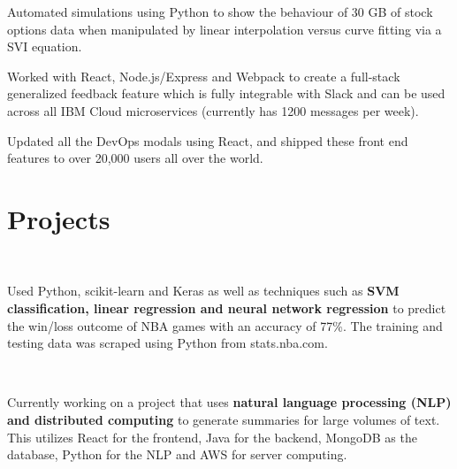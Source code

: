 \documentclass[]{anand-resume}
\begin{document}
\begin{minipage}[t]{0.69\textwidth}
\begin{tightemize}
\item Automated simulations using Python to show the behaviour of 30 GB of stock options data when manipulated by linear interpolation versus curve fitting via a SVI equation.
\end{tightemize}
\sectionsep

\begin{tightemize}\item Worked with React, Node.js/Express and Webpack to create a full-stack generalized feedback feature which is fully integrable with Slack and can be used across all IBM Cloud microservices (currently has 1200 messages per week).

\item Updated all the DevOps modals using React, and shipped these front end features to over 20,000 users all over the world.
\end{tightemize}
\sectionsep



\section{Projects}
\\
\begin{tightemize}\item Used Python, scikit-learn and Keras as well as techniques such as \textbf{SVM classification, linear regression and neural network regression} to predict the win/loss outcome of NBA games with an accuracy of 77\%. The training and testing data was scraped using Python from stats.nba.com.
\end{tightemize}
\sectionsep

 \\
\begin{tightemize}\item Currently working on a project that uses \textbf{natural language processing (NLP) and distributed computing} to generate summaries for large volumes of text. This utilizes React for the frontend, Java for the backend, MongoDB as the database, Python for the NLP and AWS for server computing.
\end{tightemize}
\sectionsep



\end{minipage} 
\end{document}
